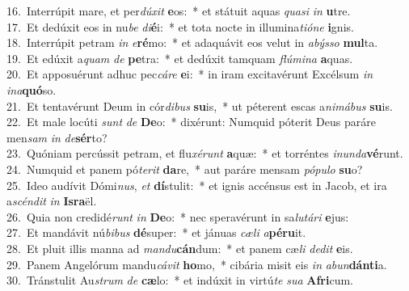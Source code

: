 {16.~}Interrúpit mare, et per\textit{dú}\textit{xit} \textbf{e}os:~* et státuit aquas \textit{qua}\textit{si} \textit{in} \textbf{u}tre.\\
{17.~}Et dedúxit eos in nu\textit{be} \textit{di}\textbf{é}i:~* et tota nocte in illumina\textit{ti}\textit{ó}\textit{ne} \textbf{i}gnis.\\
{18.~}Interrúpit petram \textit{in} \textit{e}\textbf{ré}mo:~* et adaquávit eos velut in \textit{a}\textit{býs}\textit{so} \textbf{mul}ta.\\
{19.~}Et edúxit a\textit{quam} \textit{de} \textbf{pe}tra:~* et dedúxit tamquam \textit{flú}\textit{mi}\textit{na} \textbf{a}quas.\\
{20.~}Et apposuérunt adhuc pec\textit{cá}\textit{re} \textbf{e}i:~* in iram excitavérunt Excélsum \textit{in} \textit{i}\textit{na}\textbf{quó}so.\\
{21.~}Et tentavérunt Deum in cór\textit{di}\textit{bus} \textbf{su}is,~* ut péterent escas a\textit{ni}\textit{má}\textit{bus} \textbf{su}is.\\
{22.~}Et male locúti \textit{sunt} \textit{de} \textbf{De}o:~* dixérunt: Numquid póterit Deus paráre men\textit{sam} \textit{in} \textit{de}\textbf{sér}to?\\
{23.~}Quóniam percússit petram, et flu\textit{xé}\textit{runt} \textbf{a}quæ:~* et torréntes \textit{i}\textit{nun}\textit{da}\textbf{vé}runt.\\
{24.~}Numquid et panem pó\textit{te}\textit{rit} \textbf{da}re,~* aut paráre mensam \textit{pó}\textit{pu}\textit{lo} \textbf{su}o?\\
{25.~}Ideo audívit Dómi\textit{nus}, \textit{et} \textbf{dí}stulit:~* et ignis accénsus est in Jacob, et ira a\textit{scén}\textit{dit} \textit{in} \textbf{Is}\textbf{ra}ël.\\
{26.~}Quia non credidé\textit{runt} \textit{in} \textbf{De}o:~* nec speravérunt in sa\textit{lu}\textit{tá}\textit{ri} \textbf{e}jus:\\
{27.~}Et mandávit nú\textit{bi}\textit{bus} \textbf{dé}super:~* et jánuas \textit{cæ}\textit{li} \textit{a}\textbf{pé}\textbf{ru}it.\\
{28.~}Et pluit illis manna ad \textit{man}\textit{du}\textbf{cán}dum:~* et panem cæ\textit{li} \textit{de}\textit{dit} \textbf{e}is.\\
{29.~}Panem Angelórum mandu\textit{cá}\textit{vit} \textbf{ho}mo,~* cibária misit eis \textit{in} \textit{a}\textit{bun}\textbf{dán}\textbf{ti}a.\\
{30.~}Tránstulit Au\textit{strum} \textit{de} \textbf{cæ}lo:~* et indúxit in virtú\textit{te} \textit{su}\textit{a} \textbf{A}\textbf{fri}cum.\\
